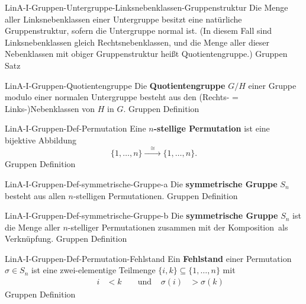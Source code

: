 \documentclass[10pt]{article}
\begin{document}
\begin{note}{LinA-I-Gruppen-Untergruppe-Linksnebenklassen-Gruppenstruktur}
  \field
  \field
  Die Menge aller Linksnebenklassen einer Untergruppe besitzt eine natürliche Gruppenstruktur, sofern die Untergruppe normal ist.\clend
  \field
  (In diesem Fall sind Linksnebenklassen gleich Rechtsnebenklassen, und die Menge aller dieser Nebenklassen mit obiger Gruppenstruktur heißt Quotientengruppe.)
  \field Gruppen
  \field Satz  
\end{note}

\begin{note}{LinA-I-Gruppen-Quotientengruppe}
  \field
  \field
  Die \textbf{Quotientengruppe} \(G/H\) einer Gruppe modulo einer normalen Untergruppe besteht aus den (Rechts- = Links-)\allowbreak Nebenklassen von \(H\) in \(G\).\clend
  \field
  \field Gruppen
  \field Definition
\end{note}

\begin{note}{LinA-I-Gruppen-Def-Permutation}
  \field
  \field
  Eine \textbf{\(n\)-stellige Permutation} ist eine bijektive Abbildung
  \[
    \{1,\dots, n\} \xrightarrow{\quad\cong\quad} \{1,\dots,n\}.
  \]
  \clend
  \field
  \field Gruppen
  \field Definition  
\end{note}

\begin{note}{LinA-I-Gruppen-Def-symmetrische-Gruppe-a}
  \field
  \field
  Die \textbf{symmetrische Gruppe} \(S_n\) besteht aus allen \(n\)-stelligen Permutationen.\clend
  \field
  \field Gruppen
  \field Definition
\end{note}

\begin{note}{LinA-I-Gruppen-Def-symmetrische-Gruppe-b}
  \field
  \field
  Die \textbf{symmetrische Gruppe} \(S_n\) ist die Menge aller \(n\)-stelliger Permutationen zusammen mit der Komposition\clend\ als Verknüpfung.
  \field
  \field Gruppen
  \field Definition  
\end{note}

\begin{note}{LinA-I-Gruppen-Def-Permutation-Fehlstand}
  \field
  \field
  Ein \textbf{Fehlstand} einer Permutation \(\sigma\in S_n\) ist eine zwei-elementige Teilmenge \(\{i,k\}\subseteq\{1,\dots, n\}\) mit
  \begin{align*}
    && i&<k &&\text{ und } &\sigma(i) &> \sigma(k)
  \end{align*}
  \clend
  \field
  \field Gruppen
  \field Definition 
\end{note}
\end{document}
